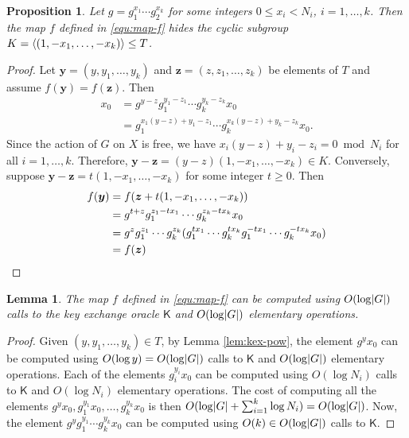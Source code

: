\documentclass[11pt]{article}
\theoremstyle{plain}
\newtheorem{lemma}[theorem]{Lemma}
\newtheorem{proposition}[theorem]{Proposition}
\theoremstyle{definition}
\DeclarePairedDelimiter{\abs}{\lvert}{\rvert}
\DeclarePairedDelimiter{\lrang}{\langle}{\rangle}
\newcommand{\kex}{\mathsf{K}}
\begin{document}
\begin{proposition}
\label{prop:f-hide}
	Let $g = g_1^{x_1} \cdots g_2^{x_k}$ for some integers $0 \le x_i < N_i$, $i = 1, \dots, k$. 
	Then the map $f$ defined in \eqref{equ:map-f} hides the cyclic subgroup $K = \lrang{(1, -x_1, 
	\dots, -x_k)} \le T$.
\end{proposition}
\begin{proof}
	Let $\bm{y} = (y, y_1, \dots, y_k)$ and $\bm{z} = (z, z_1, \dots, z_k)$ be elements of $T$ and 
	assume $f(\bm{y}) = f(\bm{z})$. Then
	\begin{align*}
		x_0 
		& = g^{y - z} g_1^{y_1 - z_1} \cdots g_k^{y_k - z_k} x_0 \\
		& = g_1^{x_1(y - z) + y_1 - z_1} \cdots g_k^{x_k(y - z) + y_k - z_k} x_0.
	\end{align*}
	Since the action of $G$ on $X$ is free, we have $x_i(y - z) + y_i - z_i = 0 \bmod N_i$ for all 
	$i = 1, \dots, k$. Therefore, $\bm{y} - \bm{z} = (y - z)(1, -x_1, \dots, -x_k) \in K$. 
	Conversely, suppose $\bm{y} - \bm{z} = t(1, -x_1, \dots, -x_k)$ for some integer $t \ge 0$. Then 
	\begin{align*}
		f(\bm{y}) 
		& = f(\bm{z} + t(1, -x_1, \dots, -x_k)) \\
		& = g^{t + z} g_1^{z_1 - tx_1} \cdots g_k^{z_k - tx_k}x_0 \\
		& = g^z g_1^{z_1} \cdots g_k^{z_k} (g_1^{tx_1} \cdots g_k^{tx_k} g_1^{-tx_1} \cdots 
		g_k^{-tx_k} x_0) \\
		& = f(\bm{z}) \qedhere
	\end{align*} 
\end{proof}

\begin{lemma}
	\label{lem:compute-f}
	The map $f$ defined in \eqref{equ:map-f} can be computed using $O(\log \abs{G})$ calls to the 
	key exchange oracle $\kex$ and $O(\log \abs{G})$ elementary operations.
\end{lemma}
\begin{proof}
	Given $(y, y_1, \dots, y_k) \in T$, by Lemma \ref{lem:kex-pow}, the element $g^yx_0$ can be 
	computed using $O(\log y) = O(\log \abs{G})$ calls to $\kex$ and $O(\log \abs{G})$ elementary 
	operations. Each of the elements $g_i^{y_i}x_0$ can be computed using $O(\log N_i)$ calls to 
	$\kex$ and $O(\log N_i)$ elementary operations. The cost of computing all the elements $g^yx_0, 
	g_1^{y_1}x_0, \dots, g_k^{y_k}x_0$ is then $O(\log \abs{G} + \sum_{i = 1}^k \log N_i) = O(\log 
	\abs{G})$. Now, the element $g^y g_1^{y_1} \cdots g_k^{y_k}x_0$ can be computed using $O(k) \in 
	O(\log \abs{G})$ calls to $\kex$. 
\end{proof}
\end{document}
